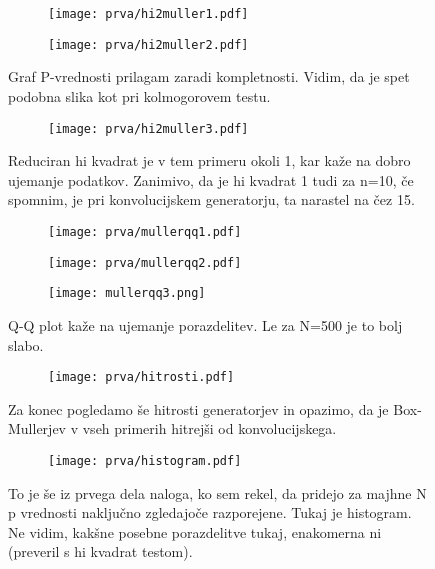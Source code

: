 \documentclass{article}
\begin{document}
\begin{figure}[H]
\centering
\begin{subfigure}{.49\textwidth}
\texttt{[image: prva/hi2muller1.pdf]}
\end{subfigure}
\begin{subfigure}{.49\textwidth}
\texttt{[image: prva/hi2muller2.pdf]}
\end{subfigure}
\caption*{Graf P-vrednosti prilagam zaradi kompletnosti. Vidim, da je spet podobna slika kot pri kolmogorovem testu.}
\end{figure}

\begin{figure}[H]
\centering
\begin{subfigure}{.49\textwidth}
\texttt{[image: prva/hi2muller3.pdf]}
\end{subfigure}
\caption*{Reduciran hi kvadrat je v tem primeru okoli 1, kar kaže na dobro ujemanje podatkov. Zanimivo, da je hi kvadrat 1 tudi za n=10, če spomnim, je pri konvolucijskem generatorju, ta narastel na čez 15.}
\end{figure}

\begin{figure}[H]
\centering
\begin{subfigure}{.32\textwidth}
\texttt{[image: prva/mullerqq1.pdf]}
\end{subfigure}
\begin{subfigure}{.32\textwidth}
\texttt{[image: prva/mullerqq2.pdf]}
\end{subfigure}
\begin{subfigure}{.32\textwidth}
\texttt{[image: mullerqq3.png]}
\end{subfigure}
\caption*{Q-Q plot kaže na ujemanje porazdelitev. Le za N=500 je to bolj slabo.}
\end{figure}

\begin{figure}[H]
\centering
\begin{subfigure}{.7\textwidth}
\texttt{[image: prva/hitrosti.pdf]}
\end{subfigure}
\caption*{Za konec pogledamo še hitrosti generatorjev in opazimo, da je Box-Mullerjev v vseh primerih hitrejši od konvolucijskega.}
\end{figure}

\begin{figure}[H]
\centering
\begin{subfigure}{.7\textwidth}
\texttt{[image: prva/histogram.pdf]}
\end{subfigure}
\caption*{To je še iz prvega dela naloga, ko sem rekel, da pridejo za majhne N p vrednosti naključno zgledajoče razporejene. Tukaj je histogram. Ne vidim, kakšne posebne porazdelitve tukaj, enakomerna ni (preveril s hi kvadrat testom).}
\end{figure}
\end{document}
